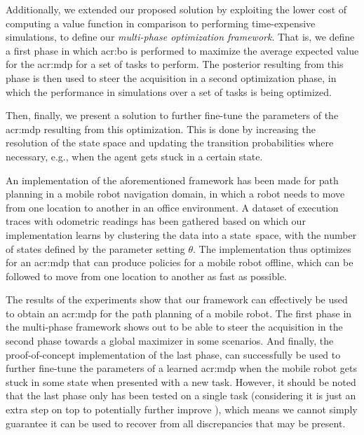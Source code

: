 Additionally, we extended our proposed solution by exploiting the lower cost of computing a value function in comparison to performing time-expensive simulations, to define our \textit{multi-phase optimization framework}.
That is, we define a first phase in which \acrshort{acr:bo} is performed to maximize the average expected value for the \acrshort{acr:mdp} for a set of tasks to perform.
The posterior resulting from this phase is then used to steer the acquisition in a second optimization phase, in which the performance in simulations over a set of tasks is being optimized.

Then, finally, we present a solution to further fine-tune the parameters of the \acrshort{acr:mdp} resulting from this optimization.
This is done by increasing the resolution of the state space and updating the transition probabilities where necessary, e.g., when the agent gets stuck in a certain state.

An implementation of the aforementioned framework has been made for path planning in a mobile robot navigation domain, in which a robot needs to move from one location to another in an office environment.
A dataset of execution traces with odometric readings has been gathered based on which our implementation learns  by clustering the data into a state~space, with the number of states defined by the parameter setting $\theta$.
The implementation thus optimizes for an \acrshort{acr:mdp} that can produce policies for a mobile robot offline, which can be followed to move from one location to another as fast as possible.

The results of the experiments show that our framework can effectively be used to obtain an \acrshort{acr:mdp} for the path planning of a mobile robot.
The first phase in the multi-phase framework shows out to be able to steer the acquisition in the second phase towards a global maximizer in some scenarios.
And finally, the proof-of-concept implementation of the last phase, can successfully be used to further fine-tune the parameters of a learned \acrshort{acr:mdp} when the mobile robot gets stuck in some state when presented with a new task.
However, it should be noted that the last phase only has been tested on a single task (considering it is just an extra step on top to potentially further improve ), which means we cannot simply guarantee it can be used to recover from all discrepancies that may be present.



